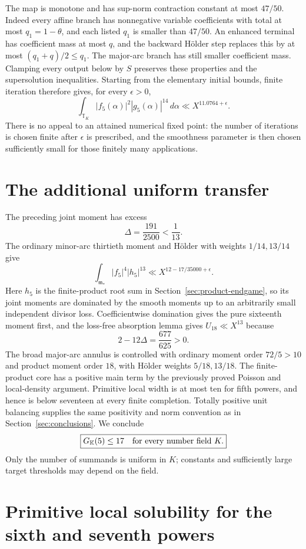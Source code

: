 \documentclass[11pt,reqno]{amsart}
\numberwithin{equation}{section}
\theoremstyle{definition}
\begin{document}
The map is monotone and has sup-norm contraction constant at most $47/50$.
Indeed every affine branch has nonnegative variable coefficients with total
at most $q_1=1-\theta$, and each listed $q_1$ is smaller than $47/50$.
An enhanced terminal has coefficient mass at most $q$, and the backward
H\"older step replaces this by at most $(q_1+q)/2\le q_1$.
The major-arc branch has still smaller coefficient mass.
Clamping every output below by $S$ preserves these properties and the
supersolution inequalities.  Starting from the elementary initial bounds,
finite iteration therefore gives, for every $\epsilon>0$,
\[
 \int_{\mathbb T_K}|f_5(\alpha)|^2|g_5(\alpha)|^{14}\,d\alpha
          \ll X^{11.0764+\epsilon}.
\]
There is no appeal to an attained numerical fixed point: the number of
iterations is chosen finite after $\epsilon$ is prescribed, and the
smoothness parameter is then chosen sufficiently small for those finitely
many applications.

\section{The additional uniform transfer}
\label{sec:k5-global}
The preceding joint moment has excess
\[
 \Delta=\frac{191}{2500}<\frac1{13}.
\]
The ordinary minor-arc thirtieth moment and H\"older with weights
$1/14,13/14$ give
\[
 \int_{\mathfrak m_*}|f_5|^4|h_5|^{13}
 \ll X^{12-17/35000+\epsilon}.
\]
Here $h_5$ is the finite-product root sum in Section~\ref{sec:product-endgame}, so its
joint moments are dominated by the smooth moments up to an arbitrarily
small independent divisor loss.  Coefficientwise domination gives the
pure sixteenth moment first, and the loss-free absorption lemma gives
$U_{18}\ll X^{13}$ because
\[
 2-12\Delta=\frac{677}{625}>0.
\]
The broad major-arc annulus is controlled with ordinary moment order
$72/5>10$ and product moment order $18$, with H\"older weights $5/18,13/18$.
The finite-product core has a positive main term by the previously proved
Poisson and local-density argument.  Primitive local width is at most ten
for fifth powers, and hence is below seventeen at every finite completion.
Totally positive unit balancing supplies the same positivity and norm
convention as in Section~\ref{sec:conclusions}.  We conclude
\[
 \boxed{G_{\mathbb K}(5)\le17\quad\hbox{for every number field }K.}
\]
Only the number of summands is uniform in $K$; constants and sufficiently
large target thresholds may depend on the field.


\section{Primitive local solubility for the sixth and seventh powers}
\label{sec:lh6-local}
\end{document}
